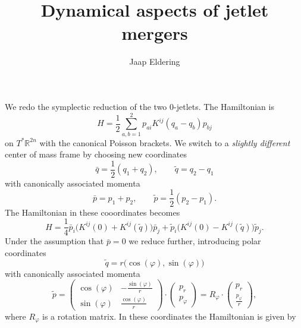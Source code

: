 \documentclass[a4paper,11pt]{article}
\title{Dynamical aspects of jetlet mergers}
\author{Jaap Eldering}
\newcommand{\R}{\ensuremath{\mathbb{R}}}
\begin{document}
\maketitle

We redo the symplectic reduction of the two $0$-jetlets. The
Hamiltonian is
\begin{equation}\label{eq:H-two-0jetlets}
  H = \frac{1}{2} \sum_{a,b=1}^2 p_{ai} K^{ij}(q_a - q_b) p_{bj}
\end{equation}
on $T^* \R^{2n}$ with the canonical Poisson brackets. We switch to a
\emph{slightly different} center of mass frame by choosing new
coordinates
\begin{equation}\label{eq:CoM-coords}
  \bar{q} = \frac{1}{2}(q_1 + q_2), \qquad \tilde{q} = q_2 - q_1
\end{equation}
with canonically associated momenta
\begin{equation*}
  \bar{p} = p_1 + p_2, \qquad \tilde{p} = \frac{1}{2}(p_2 - p_1).
\end{equation*}
The Hamiltonian in these cooordinates becomes
\begin{equation*}
  H = \frac{1}{4} \bar{p}_i \big( K^{ij}(0) + K^{ij}(\tilde{q}) \big)   \bar{p}_j
              + \tilde{p}_i \big( K^{ij}(0) - K^{ij}(\tilde{q}) \big) \tilde{p}_j.
\end{equation*}
Under the assumption that $\bar{p} = 0$ we reduce further, introducing
polar coordinates
\begin{equation}\label{eq:polar-coords}
  \tilde{q} = r \big(\cos(\varphi),\sin(\varphi)\big)
\end{equation}
with canonically associated momenta
\begin{equation*}
  \tilde{p} =
  \begin{pmatrix}
    \cos(\varphi) & -\frac{\sin(\varphi)}{r} \\
    \sin(\varphi) &  \frac{\cos(\varphi)}{r}
  \end{pmatrix} \cdot
  \begin{pmatrix}
    p_r \\
    p_\varphi
  \end{pmatrix}
  = R_\varphi \cdot
  \begin{pmatrix}
    p_r \\
    \frac{p_\varphi}{r}
  \end{pmatrix},
\end{equation*}
where $R_\varphi$ is a rotation matrix. In these coordinates the
Hamiltonian is given by
\end{document}
